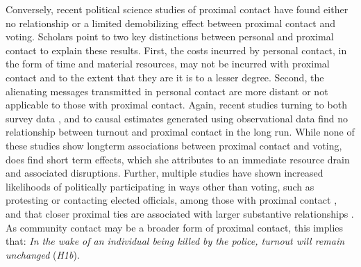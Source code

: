\documentclass[12pt]{article}
\newcommand{\kscomment}[1]{\textbf{\textcolor{Thistle}{[[ #1 --- KS ]]}}}
\begin{document}
Conversely, recent political science studies of proximal contact have found either no relationship or a limited demobilizing effect between proximal contact and voting. Scholars point to two key distinctions between personal and proximal contact to explain these results. First, the costs incurred by personal contact, in the form of time and material resources, may not be incurred with proximal contact and to the extent that they are it is to a lesser degree. Second, the alienating messages transmitted in personal contact are more distant or not applicable to those with proximal contact. Again, recent studies turning to both survey data \citep{walker2014extending,walker2017love,walker2020mobilized}, and to causal estimates generated using observational data \citep{white2019family} find no relationship between turnout and proximal contact in the long run. While none of these studies show longterm associations between proximal contact and voting, \cite{white2019family} does find short term effects, which she attributes to an immediate resource drain and associated disruptions. Further, multiple studies have shown increased likelihoods of politically participating in ways other than voting, such as protesting or contacting elected officials, among those with proximal contact \citep[e.g., ][]{walker2019targeted,walker2020mobilized}, and that closer proximal ties are associated with larger substantive relationships \citep{walker2014extending}. 
As community contact may be a broader form of proximal contact, this implies that: \textit{In the wake of an individual being killed by the police, turnout will remain unchanged} (\textit{H1b}).

\end{document}
